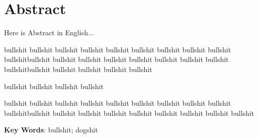 \section*{ Abstract}

Here is Abstract in English...

bullshit bullshit bullshit bullshit bullshit bullshit bullshit bullshit bullshit bullshitbullshit bullshit bullshit bullshit bullshit bullshit bullshit bullshit bullshitbullshit bullshit bullshit bullshit bullshit

bullshit bullshit bullshit bullshit


bullshit bullshit bullshit bullshit bullshit bullshit bullshit bullshit bullshit bullshitbullshit bullshit bullshit bullshit bullshit bullshit bullshit bullshit bullshit

\noindent
\textbf{Key Words}:
bullshit; dogshit
\indent 